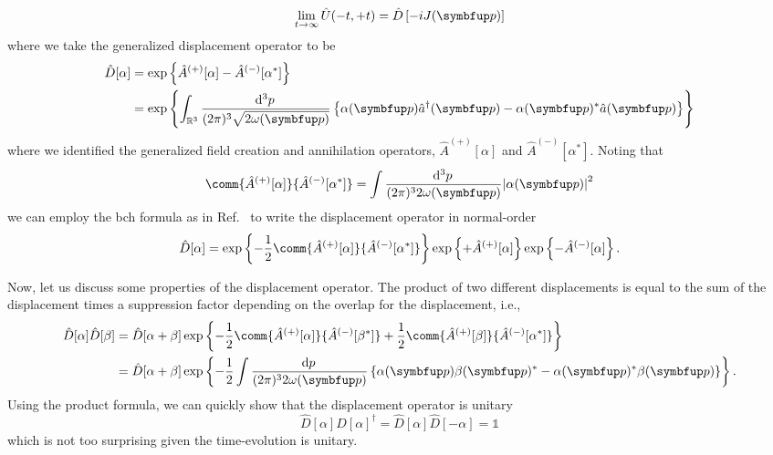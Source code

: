 \begin{equation}
	\lim_{t\to\infty}\hat{U}(-t,+t)
	=
	\hat{D}\left[-iJ(\vb{p})\right]
\end{equation}
where we take the generalized displacement operator to be
\begin{equation}
	\begin{split}
		\hat{D}[\alpha]
		&=
		\exp\left\{
			\hat{A}^{(+)}[\alpha]
			-
			\hat{A}^{(-)}[\alpha^*]
		\right\}
		\\
		&=
		\exp\left\{
			\int_{\mathbb{R}^3}\frac{\dd[3]{p}}{(2\pi) ^3\sqrt{2\omega(\vb{p})}}
			\left\{
				\alpha(\vb{p})
				\hat{a}^\dagger(\vb{p})
				-
				\alpha(\vb{p})^*
				\hat{a}(\vb{p})
			\right\}
		\right\}
	\end{split}
	\label{eq:displacement_operator}
\end{equation}
where we identified the generalized field creation and annihilation operators, $\hat{A}^{(+)}[\alpha]$ and $\hat{A}^{(-)}[\alpha^*]$.
Noting that
\begin{equation}
	\comm{\hat{A}^{(+)}[\alpha]}{\hat{A}^{(-)}[\alpha^*]}
	=
	\int\frac{\dd[3]{p}}{(2\pi)^32\omega(\vb{p})}
	\abs*{\alpha(\vb{p})}^2
\end{equation}
we can employ the \gls{bch} formula as in Ref.~\cite[p.~48]{Barnett2002} to write the displacement operator in normal-order
\begin{equation}
	\hat{D}[\alpha]
	=
	\exp\left\{
		-
		\frac{1}{2}
		\comm{\hat{A}^{(+)}[\alpha]}{\hat{A}^{(-)}[\alpha^*]}
	\right\}
	\exp\left\{
		+
		\hat{A}^{(+)}[\alpha]
	\right\}
	\exp\left\{
		-
		\hat{A}^{(-)}[\alpha]
	\right\}
	.
\end{equation}

Now, let us discuss some properties of the displacement operator.
The product of two different displacements is equal to the sum of the displacement times a suppression factor depending on the overlap for the displacement, i.e.,
\begin{equation}
	\begin{split}
		\hat{D}[\alpha]
		\hat{D}[\beta]
		&=
		\hat{D}[\alpha+\beta]
		\exp\left\{
			-
			\frac{1}{2}
			\comm{\hat{A}^{(+)}[\alpha]}{\hat{A}^{(-)}[\beta^*]}
			+
			\frac{1}{2}
			\comm{\hat{A}^{(+)}[\beta]}{\hat{A}^{(-)}[\alpha^*]}
		\right\}
		\\
		&=
		\hat{D}[\alpha+\beta]
		\exp\left\{
			-
			\frac{1}{2}
			\int\frac{\dd{p}}{(2\pi)^32\omega(\vb{p})}
			\left\{
				\alpha(\vb{p})
				\beta(\vb{p})^*
				-
				\alpha(\vb{p})^*
				\beta(\vb{p})
			\right\}
		\right\}
		.
	\end{split}
\end{equation}
Using the product formula, we can quickly show that the displacement operator is unitary
\begin{equation}
	\hat{D}[\alpha]
	\hat{D}[\alpha]^\dagger
	=
	\hat{D}[\alpha]
	\hat{D}[-\alpha]
	=
	\mathbb{1}
\end{equation}
which is not too surprising given the time-evolution is unitary.

